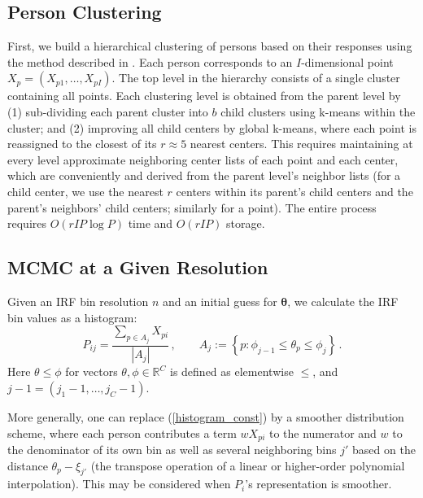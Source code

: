 \documentclass{article}
\newcommand{\R}{\mathbb{R}}
\newcommand{\ta}{\theta}
\newcommand{\bta}{\boldsymbol\ta}
\begin{document}
\subsection{Person Clustering}
\label{miniclustering}
First, we build a hierarchical clustering of persons based on their responses using the method described in \cite{miniclustering}. Each person corresponds to an $I$-dimensional point $X_p = (X_{p1},\dots,X_{pI})$. The top level in the hierarchy consists of a single cluster containing all points. Each clustering level is obtained from the parent level by (1) sub-dividing each parent cluster into $b$ child clusters using k-means within the cluster; and (2) improving all child centers by global k-means, where each point is reassigned to the closest of its $r \approx 5$ nearest centers. This requires maintaining at every level approximate neighboring center lists of each point and each center, which are conveniently and derived from the parent level's neighbor lists (for a child center, we use the nearest $r$ centers within its parent's child centers and the parent's neighbors' child centers; similarly for a point). The entire process requires $O(r I P \log P)$ time and $O(r I P)$ storage.

\subsection{MCMC at a Given Resolution}
Given an IRF bin resolution $n$ and an initial guess for $\bta$, we calculate the IRF bin values as a histogram:
\begin{equation}
	\label{histogram_const}
	P_{ij} = \frac{\sum_{p \in A_j} X_{pi}}{|A_j|}\,,\qquad
	A_j := \left\{ p : \phi_{j-1} \leq \ta_p \leq \phi_j \right\}\,.
\end{equation}
Here $\ta \leq \phi$ for vectors $\ta,\phi \in \R^C$ is defined as elementwise $\leq$, and $j-1 = (j_1-1,\dots,j_C-1)$.

More generally, one can replace (\ref{histogram_const}) by a smoother distribution scheme, where each person contributes a term $w X_{pi}$ to the numerator and $w$ to the denominator of its own bin as well as several neighboring bins $j'$ based on the distance $\theta_p - \xi_{j'}$ (the transpose operation of a linear or higher-order polynomial interpolation). This may be considered when $P_i$'s representation is smoother.
\end{document}
